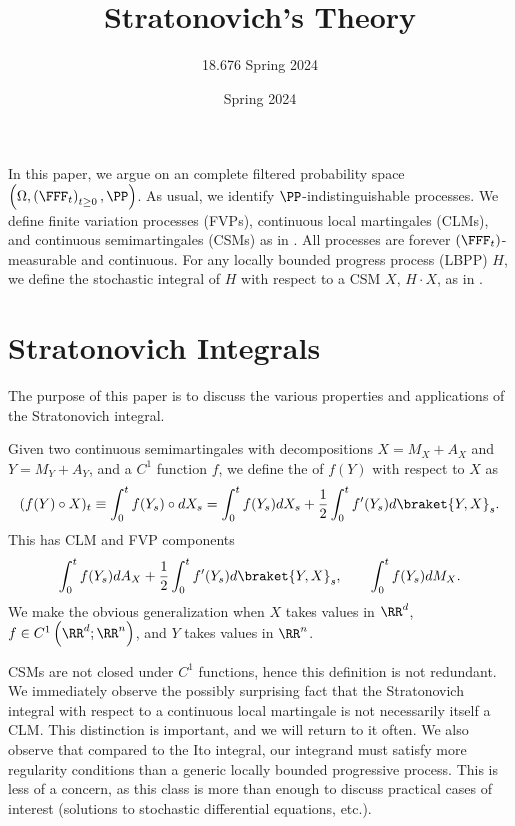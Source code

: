 \documentclass{scrartcl}
\title{Stratonovich's Theory}
\subtitle{18.676 Spring 2024}
\date{Spring 2024}
\begin{document}
\maketitle

In this paper, we argue on an complete filtered probability space $\left(\Omega, \left(\FFF_t\right)_{t\geq 0}, \PP\right)$. As usual, we identify $\PP$-indistinguishable processes. We define finite variation processes (FVPs), continuous local martingales (CLMs), and continuous semimartingales (CSMs) as in \cite{LeGall}. All processes are forever $(\FFF_t)$-measurable and continuous. For any locally bounded progress process (LBPP) $H$, we define the stochastic integral of $H$ with respect to a CSM $X$, $H\cdot X$, as in \cite{LeGall}.

\section{Stratonovich Integrals}

The purpose of this paper is to discuss the various properties and applications of the Stratonovich integral.

\begin{defn}
    Given two continuous semimartingales with decompositions $X = M_X + A_X$ and $Y = M_Y + A_Y$, and a $C^1$ function $f$, we define the  of $f(Y)$ with respect to $X$ as
    \[
        (f(Y)\circ X)_t \equiv \int_0^t f(Y_s) \circ dX_s = \int_0^t f(Y_s) dX_s + \frac{1}{2} \int_0^t f'(Y_s) d\braket{Y, X}_s.
    \]
    This has CLM and FVP components
    \[
        \int_0^t f(Y_s) dA_X + \frac{1}{2} \int_0^t f'(Y_s) d\braket{Y, X}_s,\qquad \int_0^t f(Y_s) dM_X.
    \]
    We make the obvious generalization when $X$ takes values in $\RR^d$, $f\in C^1\left(\RR^d; \RR^n\right)$, and $Y$ takes values in $\RR^n$.
\end{defn}

CSMs are not closed under $C^1$ functions, hence this definition is not redundant. We immediately observe the possibly surprising fact that the Stratonovich integral with respect to a continuous local martingale is not necessarily itself a CLM. This distinction is important, and we will return to it often. We also observe that compared to the Ito integral, our integrand must satisfy more regularity conditions than a generic locally bounded progressive process. This is less of a concern, as this class is more than enough to discuss practical cases of interest (solutions to stochastic differential equations, etc.).
\end{document}
